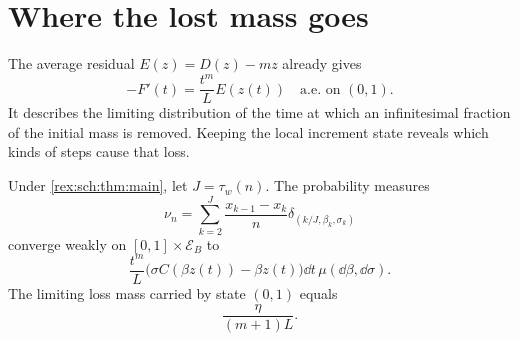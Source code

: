 \section{Where the lost mass goes}
\label{rex:sch:sec:losses}

The average residual $E(z)=D(z)-mz$ already gives
\begin{equation}\label{rex:sch:eq:ordinary-loss-density}
 -F'(t)=\frac{t^m}{L}E(z(t))\quad\text{a.e. on }(0,1).
\end{equation}
It describes the limiting distribution of the time at which an
infinitesimal fraction of the initial mass is removed. Keeping the
local increment state reveals which kinds of steps cause that loss.

\begin{theorem}\label{rex:sch:thm:loss}
Under \cref{rex:sch:thm:main}, let $J=\tau_w(n)$. The probability measures
\begin{equation}\label{rex:sch:eq:loss-measure}
 \nu_n=\sum_{k=2}^J\frac{x_{k-1}-x_k}{n}
 \delta_{(k/J,\beta_k,\sigma_k)}
\end{equation}
converge weakly on $[0,1]\times\mathcal E_B$ to
\begin{equation}\label{rex:sch:eq:marked-loss-limit}
 \boxed{\displaystyle
 \frac{t^m}{L}
 \bigl(\sigma C(\beta z(t))-\beta z(t)\bigr)
 \dd t\,\mu(\dd\beta,\dd\sigma).}
\end{equation}
The limiting loss mass carried by state $(0,1)$ equals
\begin{equation}\label{rex:sch:eq:weak-loss-fraction}
 \frac{\eta}{(m+1)L}.
\end{equation}
\end{theorem}

